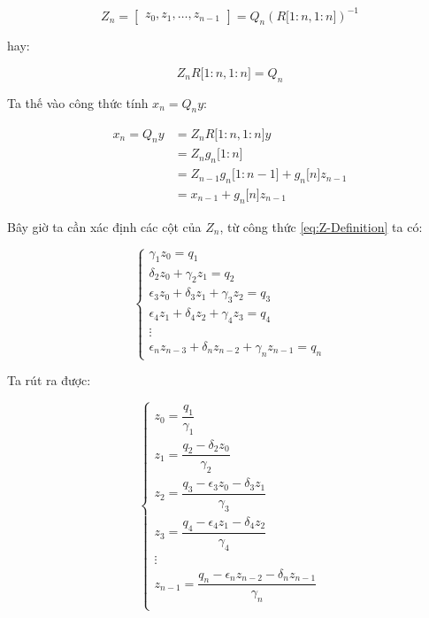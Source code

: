 \documentclass[14pt, a4paper]{article}
\numberwithin{equation}{section}
\numberwithin{algorithm}{section}
\numberwithin{figure}{section}
\numberwithin{dl}{section}
\numberwithin{md}{section}
\numberwithin{bd}{section}
\numberwithin{dn}{section}
\begin{document}
\begin{equation}
    Z_n = \begin{bmatrix}
        z_0, z_1, \dots, z_{n-1}
    \end{bmatrix}=Q_n (R\lbrack 1:n, 1:n \rbrack)^{-1}
\end{equation}

hay:

\begin{equation} \label{eq:Z-Definition}
    Z_n R\lbrack 1:n, 1:n \rbrack = Q_n
\end{equation}

Ta thế vào công thức tính $x_n = Q_n y$:

\begin{equation}
    \begin{aligned}
        x_n = Q_n y &= Z_n  R\lbrack 1:n, 1:n \rbrack y \\
        &= Z_n g_n \lbrack 1:n \rbrack \\
        &=Z_{n-1}g_n \lbrack 1:n-1 \rbrack+g_n\lbrack n \rbrack z_{n-1}\\
        &=x_{n-1} + g_n\lbrack n \rbrack z_{n-1}
    \end{aligned}
\end{equation}

Bây giờ ta cần xác định các cột của $Z_n$, từ công thức \ref{eq:Z-Definition} ta có:

\begin{equation}
    \begin{cases}
        \gamma_1 z_0 = q_1 \\
        \delta_2 z_0 + \gamma_2 z_1 = q_2 \\
        \epsilon_3 z_0 + \delta_3 z_1 + \gamma_3 z_2 = q_3 \\
        \epsilon_4 z_1 + \delta_4 z_2 + \gamma_4 z_3 = q_4 \\
        \vdots \\
        \epsilon_n z_{n-3} + \delta_n z_{n-2} + \gamma_n z_{n-1} = q_n
    \end{cases}
\end{equation}

Ta rút ra được:

\begin{equation}
    \begin{cases}
        z_0 = \dfrac{q_1}{\gamma_1}\\
        z_1 = \dfrac{q_2 - \delta_2 z_0}{\gamma_2}\\
        z_2 = \dfrac{q_3 - \epsilon_3 z_0 - \delta_3 z_1}{\gamma_3}\\
        z_3 = \dfrac{q_4 - \epsilon_4 z_1 - \delta_4 z_2}{\gamma_4}\\
        \vdots \\
        z_{n-1} = \dfrac{q_n - \epsilon_n z_{n-2} - \delta_n z_{n-1}}{\gamma_n} \\
    \end{cases}
\end{equation}
\end{document}
